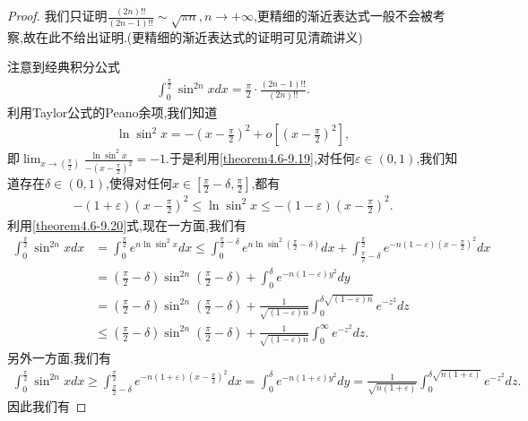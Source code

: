 \documentclass[lang=cn,newtx,10pt,scheme=chinese]{elegantbook}
\begin{document}
\begin{proof}
   我们只证明$\frac{(2n)!!}{(2n-1)!!}\sim \sqrt{\pi n},n\rightarrow +\infty$,更精细的渐近表达式一般不会被考察,故在此不给出证明.(更精细的渐近表达式的证明可见清疏讲义)

注意到经典积分公式
\begin{align}\label{theorem4.6-1.1}
   \int_{0}^{\frac{\pi}{2}}\sin^{2n}x dx=\frac{\pi}{2}\cdot\frac{(2n - 1)!!}{(2n)!!}.
\end{align}
利用Taylor公式的Peano余项,我们知道
\begin{align}\label{theorem4.6-9.19}
   \ln\sin^{2}x=-\left(x - \frac{\pi}{2}\right)^{2}+o\left[\left(x - \frac{\pi}{2}\right)^{2}\right],
\end{align}
即\(\lim_{x\rightarrow(\frac{\pi}{2})}\frac{\ln\sin^{2}x}{-(x - \frac{\pi}{2})^{2}}=-1\).于是利用\eqref{theorem4.6-9.19},对任何\(\varepsilon\in(0,1)\),我们知道存在\(\delta\in(0,1)\),使得对任何\(x\in[\frac{\pi}{2}-\delta,\frac{\pi}{2}]\),都有
\begin{align}\label{theorem4.6-9.20}
  -(1 + \varepsilon)\left(x - \frac{\pi}{2}\right)^{2}\leqslant\ln\sin^{2}x\leqslant-(1 - \varepsilon)\left(x - \frac{\pi}{2}\right)^{2}.
\end{align}
利用\eqref{theorem4.6-9.20}式,现在一方面,我们有
\begin{align*}
\int_{0}^{\frac{\pi}{2}}\sin^{2n}x dx&=\int_{0}^{\frac{\pi}{2}}e^{n\ln\sin^{2}x}dx
\leqslant\int_{0}^{\frac{\pi}{2}-\delta}e^{n\ln\sin^{2}(\frac{\pi}{2}-\delta)}dx+\int_{\frac{\pi}{2}-\delta}^{\frac{\pi}{2}}e^{-n(1 - \varepsilon)(x - \frac{\pi}{2})^{2}}dx\\
&=(\frac{\pi}{2}-\delta)\sin^{2n}(\frac{\pi}{2}-\delta)+\int_{0}^{\delta}e^{-n(1 - \varepsilon)y^{2}}dy\\
&=(\frac{\pi}{2}-\delta)\sin^{2n}(\frac{\pi}{2}-\delta)+\frac{1}{\sqrt{(1 - \varepsilon)n}}\int_{0}^{\delta\sqrt{(1 - \varepsilon)n}}e^{-z^{2}}dz\\
&\leqslant(\frac{\pi}{2}-\delta)\sin^{2n}(\frac{\pi}{2}-\delta)+\frac{1}{\sqrt{(1 - \varepsilon)n}}\int_{0}^{\infty}e^{-z^{2}}dz.
\end{align*}
另外一方面,我们有
\begin{align*}
\int_{0}^{\frac{\pi}{2}}\sin^{2n}x dx\geqslant\int_{\frac{\pi}{2}-\delta}^{\frac{\pi}{2}}e^{-n(1 + \varepsilon)(x - \frac{\pi}{2})^{2}}dx
=\int_{0}^{\delta}e^{-n(1 + \varepsilon)y^{2}}dy
=\frac{1}{\sqrt{n(1 + \varepsilon)}}\int_{0}^{\delta\sqrt{n(1 + \varepsilon)}}e^{-z^{2}}dz.
\end{align*}
因此我们有

\end{proof}
\end{document}
